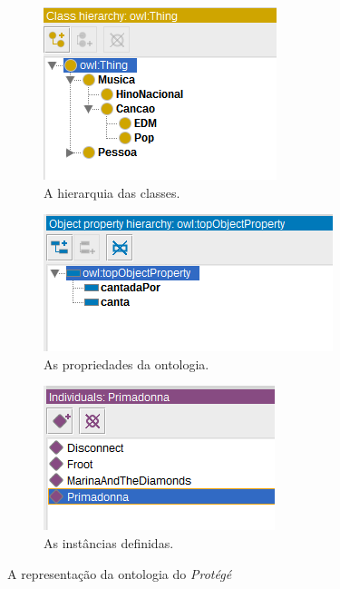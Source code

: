 \begin{figure}[H]
	\centering
	\begin{subfigure}{.3\textwidth}
		\centering
		\includegraphics[width=0.95\linewidth]{Capitulos/Ferramentas/classes}
		\caption{A hierarquia das classes.}
	\end{subfigure}%
	\begin{subfigure}{.475\textwidth}
		\centering
		\includegraphics[width=0.95\linewidth]{Capitulos/Ferramentas/propriedades}
		\caption{As propriedades da ontologia.}
	\end{subfigure}
	\begin{subfigure}{.3\textwidth}
		\centering
		\includegraphics[width=0.95\linewidth]{Capitulos/Ferramentas/individuos}
		\caption{As instâncias definidas.}
	\end{subfigure}
	\caption{A representação da ontologia do \textit{Protégé}}
\end{figure}
 
